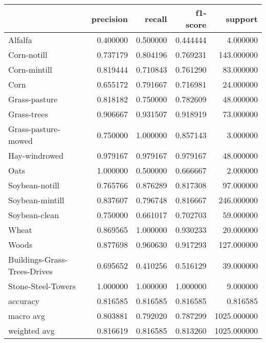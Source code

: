 \begin{tabular}{lrrrr}
\toprule
{} &  precision &    recall &  f1-score &      support \\
\midrule
Alfalfa                      &   0.400000 &  0.500000 &  0.444444 &     4.000000 \\
Corn-notill                  &   0.737179 &  0.804196 &  0.769231 &   143.000000 \\
Corn-mintill                 &   0.819444 &  0.710843 &  0.761290 &    83.000000 \\
Corn                         &   0.655172 &  0.791667 &  0.716981 &    24.000000 \\
Grass-pasture                &   0.818182 &  0.750000 &  0.782609 &    48.000000 \\
Grass-trees                  &   0.906667 &  0.931507 &  0.918919 &    73.000000 \\
Grass-pasture-mowed          &   0.750000 &  1.000000 &  0.857143 &     3.000000 \\
Hay-windrowed                &   0.979167 &  0.979167 &  0.979167 &    48.000000 \\
Oats                         &   1.000000 &  0.500000 &  0.666667 &     2.000000 \\
Soybean-notill               &   0.765766 &  0.876289 &  0.817308 &    97.000000 \\
Soybean-mintill              &   0.837607 &  0.796748 &  0.816667 &   246.000000 \\
Soybean-clean                &   0.750000 &  0.661017 &  0.702703 &    59.000000 \\
Wheat                        &   0.869565 &  1.000000 &  0.930233 &    20.000000 \\
Woods                        &   0.877698 &  0.960630 &  0.917293 &   127.000000 \\
Buildings-Grass-Trees-Drives &   0.695652 &  0.410256 &  0.516129 &    39.000000 \\
Stone-Steel-Towers           &   1.000000 &  1.000000 &  1.000000 &     9.000000 \\
accuracy                     &   0.816585 &  0.816585 &  0.816585 &     0.816585 \\
macro avg                    &   0.803881 &  0.792020 &  0.787299 &  1025.000000 \\
weighted avg                 &   0.816619 &  0.816585 &  0.813260 &  1025.000000 \\
\bottomrule
\end{tabular}
